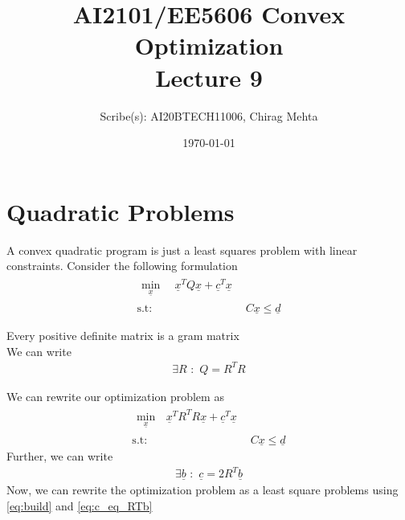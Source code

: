 \documentclass{tufte-handout}
\title[Lecture 9]{\large AI2101/EE5606 Convex Optimization \\ \LARGE Lecture 9}
\author[Chirag Mehta]{Scribe(s): AI20BTECH11006, Chirag Mehta}
\date{\today}  %
\theoremstyle{remark}
\renewcommand{\vec}[1]{\underline{#1}}
\newcommand\twospace{\,\,}
\begin{document}
\maketitle
{}



\section{Quadratic Problems}
A convex quadratic program is just a least squares problem with linear constraints. Consider the following formulation
\begin{align}
    \begin{split}
        \min_{\vec{x}}\, &\twospace\vec{x}^TQ\vec{x} + \vec{c}^T\vec{x}
    \end{split}\\ 
    \text{s.t:}
    \twospace & C\vec{x} \leq \vec{d}
\end{align}

 Every positive definite matrix is a gram matrix\\
We can write
\begin{align}
    \exists R \twospace : \twospace Q = R^TR
\end{align}

We can rewrite our optimization problem as
\begin{align}
    \begin{split}
        \min_{\vec{x}}\, &\vec{x}^TR^TR\vec{x} + \vec{c}^T\vec{x}
    \end{split} \label{eq:build}\\ 
    \text{s.t:}
    \twospace & C\vec{x} \leq \vec{d}
\end{align}
Further, we can write
\begin{align}\exists \vec{b}\twospace : \twospace \vec{c} = 2R^T\vec{b} \label{eq:c_eq_RTb}\end{align}
 Now, we can rewrite the optimization problem as a least square problems using \eqref{eq:build} and \eqref{eq:c_eq_RTb}
\end{document}
